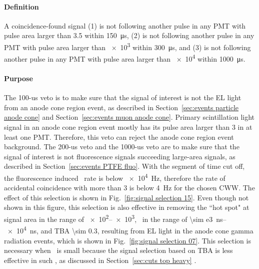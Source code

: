 \paragraph{Definition}
A coincidence-found signal (1) is not following another pulse in any PMT with pulse area larger than \SI{3.5}{\phe} within \SI{150}{\us}, (2) is not following another pulse in any PMT with pulse area larger than \SI{e3}{\phe} within \SI{300}{\us}, and (3) is not following another pulse in any PMT with pulse area larger than \SI{e4}{\phe} within \SI{1000}{\us}.
\paragraph{Purpose}
The 100-us veto is to make sure that the signal of interest is not the EL light from an anode cone region event, as described in Section~\ref{sec:events particle anode cone} and Section~\ref{sec:events muon anode cone}. Primary scintillation light signal in an anode cone region event mostly has its pulse area larger than \SI{3}{\phe} in at least one PMT. Therefore, this veto can reject the anode cone region event background. The 200-us veto and the 1000-us veto are to make sure that the signal of interest is not fluorescence signals succeeding large-area signals, as described in Section~\ref{sec:events PTFE fluo}. With the segment of time cut off, the fluorescence induced \sphe\ rate is below \SI{e4}{\Hz}, therefore the rate of accidental coincidence with more than \SI{3}{\phe} is below \SI{4}{\Hz} for the chosen CWW. The effect of this selection is shown in Fig.~\ref{fig:signal selection 15}. Even though not shown in this figure, this selection is also effective in removing the ``hot spot" at signal area in the range of \SIrange{e2}{e3}{\phe}, \rpd\ in the range of \SIrange{\sim e3}{e4}{\ns}, and TBA \num{\sim 0.3}, resulting from EL light in the anode cone gamma radiation events, which is shown in Fig.~\ref{fig:signal selection 07}. This selection is necessary when \opdv\ is small because the signal selection based on TBA is less effective in such \opdv , as discussed in Section~\ref{sec:cuts top heavy} . 

